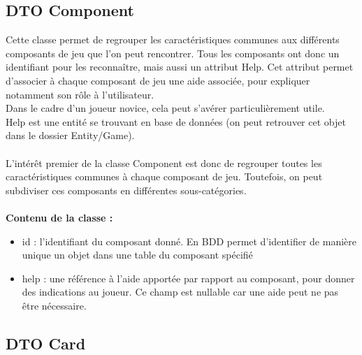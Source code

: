 \documentclass{article}
\begin{document}
            \subsection{DTO Component}

                Cette classe permet de regrouper les caractéristiques communes aux différents composants de jeu que l'on peut rencontrer. Tous les composants ont donc un identifiant pour les reconnaître, mais aussi un attribut Help. Cet attribut permet d'associer à chaque composant de jeu une aide associée, pour expliquer notamment son rôle à l'utilisateur.\\
                \indent Dans le cadre d'un joueur novice, cela peut s'avérer particulièrement utile. \\
                \indent Help est une entité se trouvant en base de données (on peut retrouver cet objet dans le dossier Entity/Game).\\
                \\
                \indent L'intérêt premier de la classe Component est donc de regrouper toutes les caractéristiques communes à chaque composant de jeu. Toutefois, on peut subdiviser ces composants en différentes sous-catégories.\\
                \\
                \textbf{Contenu de la classe :}
                \begin{itemize}
                    \item id : l'identifiant du composant donné. En BDD permet d'identifier de manière unique un objet dans une table du composant spécifié
                    \item help : une référence à l'aide apportée par rapport au composant, pour donner des indications au joueur. Ce champ est nullable car une aide peut ne pas être nécessaire.
                \end{itemize}

            \subsection{DTO Card}
\end{document}
